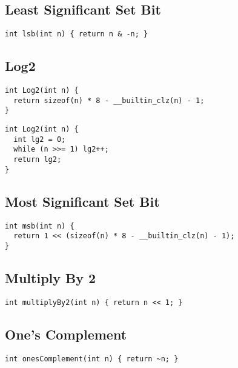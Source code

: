 \documentclass[twoside]{article}
\begin{document}
\begin{multicols*}{2}
\subsection*{Least Significant Set Bit}
\begin{verbatim}
int lsb(int n) { return n & -n; }
\end{verbatim}

\subsectionfont{\large\bfseries\sffamily\underline}
\subsection*{Log2}
\begin{verbatim}
int Log2(int n) {
  return sizeof(n) * 8 - __builtin_clz(n) - 1;
}
\end{verbatim}
\vspace{-12pt}
\begin{verbatim}
int Log2(int n) {
  int lg2 = 0;
  while (n >>= 1) lg2++;
  return lg2;
}
\end{verbatim}

\subsectionfont{\large\bfseries\sffamily\underline}
\subsection*{Most Significant Set Bit}
\begin{verbatim}
int msb(int n) {
  return 1 << (sizeof(n) * 8 - __builtin_clz(n) - 1);
}
\end{verbatim}

\subsectionfont{\large\bfseries\sffamily\underline}
\subsection*{Multiply By 2}
\begin{verbatim}
int multiplyBy2(int n) { return n << 1; }
\end{verbatim}

\subsectionfont{\large\bfseries\sffamily\underline}
\subsection*{One's Complement}
\begin{verbatim}
int onesComplement(int n) { return ~n; }
\end{verbatim}


\end{multicols*}
\end{document}
